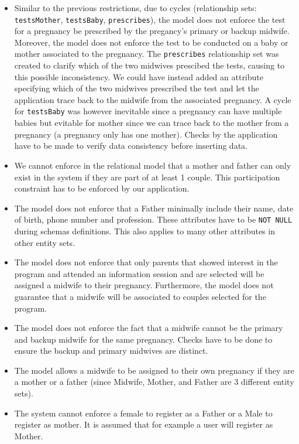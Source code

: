 \documentclass[10pt, letterpaper]{article}
\newcommand{\code}[1]{\texttt{#1}}
\begin{document}
\begin{itemize}
    \item Similar to the previous restrictions, due to cycles (relationship sets: \code{testsMother}, \code{testsBaby}, \code{prescribes}), the model does not enforce the test for a pregnancy be prescribed by the pregancy's primary or backup midwife. Moreover, the model does not enforce the test to be conducted on a baby or mother associated to the pregnancy. The \code{prescribes} relationship set was created to clarify which of the two midwives prescibed the tests, causing to this possible inconsistency. We could have instead added an attribute specifying which of the two midwives prescribed the test and let the application trace back to the midwife from the associated pregnancy. A cycle for \code{testsBaby} was however inevitable since a pregnancy can have multiple babies but evitable for mother since we can trace back to the mother from a pregnancy (a pregnancy only has one mother). Checks by the application have to be made to verify data consistency before inserting data.
    \item We cannot enforce in the relational model that a mother and father can only exist in the system if they are part of at least 1 couple. This participation constraint has to be enforced by our application.
    \item The model does not enforce that a Father minimally include their name, date of
          birth, phone number and profession. These attributes have to be \code{NOT NULL} during schemas definitions. This also applies to many other attributes in other entity sets.
    \item The model does not enforce that only parents that showed interest in the program and attended an information session and are selected will be assigned a midwife to their pregnancy. Furthermore, the model does not guarantee that a midwife will be associated to couples selected for the program.
    \item The model does not enforce the fact that a midwife cannot be the primary and backup midwife for the same pregnancy. Checks have to be done to ensure the backup and primary midwives are distinct.
    \item The model allows a midwife to be assigned to their own pregnancy if they are a mother or a father (since Midwife, Mother, and Father are 3 different entity sets).
    \item The system cannot enforce a female to register as a Father or a Male to register as mother. It is assumed that for example a user will register as Mother.

\end{itemize}
\end{document}
